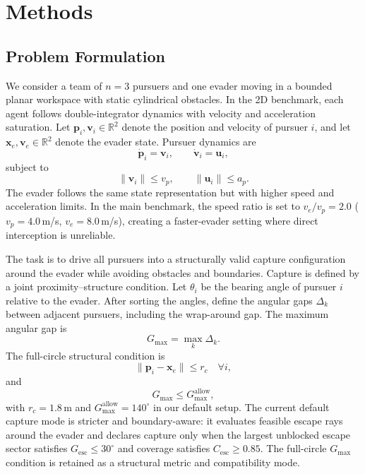 \documentclass[journal]{IEEEtran}
\newcommand{\Gmax}{G_{\max}}
\begin{document}
\section{Methods}
\label{sec:methods}

\subsection{Problem Formulation}
\label{sec:problem}

We consider a team of $n=3$ pursuers and one evader moving in a bounded planar workspace with static cylindrical obstacles.
In the 2D benchmark, each agent follows double-integrator dynamics with velocity and acceleration saturation.
Let $\mathbf{p}_i, \mathbf{v}_i \in \mathbb{R}^2$ denote the position and velocity of pursuer $i$, and let $\mathbf{x}_e, \mathbf{v}_e \in \mathbb{R}^2$ denote the evader state.
Pursuer dynamics are
\begin{equation}
  \dot{\mathbf{p}}_i = \mathbf{v}_i, \qquad \dot{\mathbf{v}}_i = \mathbf{u}_i,
  \label{eq:pursuer_dyn}
\end{equation}
subject to
\begin{equation}
  \|\mathbf{v}_i\| \le v_p, \qquad \|\mathbf{u}_i\| \le a_p.
  \label{eq:saturation}
\end{equation}
The evader follows the same state representation but with higher speed and acceleration limits.
In the main benchmark, the speed ratio is set to $v_e/v_p = 2.0$ ($v_p = 4.0$\,m/s, $v_e = 8.0$\,m/s), creating a faster-evader setting where direct interception is unreliable.

The task is to drive all pursuers into a structurally valid capture configuration around the evader while avoiding obstacles and boundaries.
Capture is defined by a joint proximity--structure condition.
Let $\theta_i$ be the bearing angle of pursuer $i$ relative to the evader.
After sorting the angles, define the angular gaps $\Delta_k$ between adjacent pursuers, including the wrap-around gap.
The maximum angular gap is
\begin{equation}
  \Gmax = \max_k \Delta_k.
  \label{eq:gmax_def}
\end{equation}
The full-circle structural condition is
\begin{equation}
  \|\mathbf{p}_i - \mathbf{x}_e\| \le r_c \quad \forall i,
  \label{eq:proximity}
\end{equation}
and
\begin{equation}
  \Gmax \le \Gmax^{\mathrm{allow}},
  \label{eq:capture}
\end{equation}
with $r_c = 1.8$\,m and $\Gmax^{\mathrm{allow}} = 140^\circ$ in our default setup.
The current default capture mode is stricter and boundary-aware: it evaluates feasible escape rays around the evader and declares capture only when the largest unblocked escape sector satisfies $G_{\mathrm{esc}} \le 30^\circ$ and coverage satisfies $C_{\mathrm{esc}} \ge 0.85$.
The full-circle $\Gmax$ condition is retained as a structural metric and compatibility mode.
\end{document}
